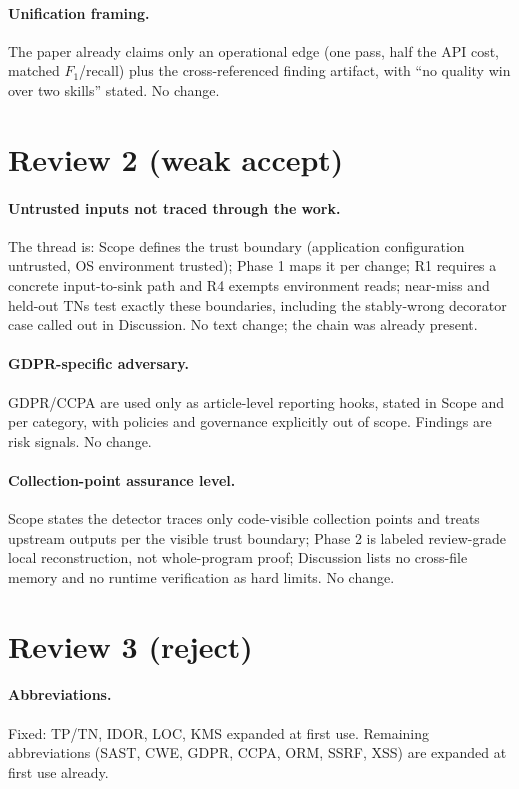 \documentclass[11pt,a4paper]{article}
\begin{document}
\paragraph{Unification framing.} The paper already claims only an operational edge (one pass, half the API cost, matched $F_1$/recall) plus the cross-referenced finding artifact, with ``no quality win over two skills'' stated. No change.

\section*{Review 2 (weak accept)}

\paragraph{Untrusted inputs not traced through the work.} The thread is: Scope defines the trust boundary (application configuration untrusted, OS environment trusted); Phase 1 maps it per change; R1 requires a concrete input-to-sink path and R4 exempts environment reads; near-miss and held-out TNs test exactly these boundaries, including the stably-wrong decorator case called out in Discussion. No text change; the chain was already present.

\paragraph{GDPR-specific adversary.} GDPR/CCPA are used only as article-level reporting hooks, stated in Scope and per category, with policies and governance explicitly out of scope. Findings are risk signals. No change.

\paragraph{Collection-point assurance level.} Scope states the detector traces only code-visible collection points and treats upstream outputs per the visible trust boundary; Phase 2 is labeled review-grade local reconstruction, not whole-program proof; Discussion lists no cross-file memory and no runtime verification as hard limits. No change.

\section*{Review 3 (reject)}

\paragraph{Abbreviations.} Fixed: TP/TN, IDOR, LOC, KMS expanded at first use. Remaining abbreviations (SAST, CWE, GDPR, CCPA, ORM, SSRF, XSS) are expanded at first use already.
\end{document}
